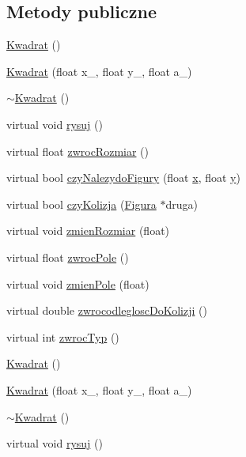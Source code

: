 \subsection*{Metody publiczne}
\begin{DoxyCompactItemize}
\item 
\hyperlink{classKwadrat_a7c105c83f59b0fa65af35714f4f55189}{Kwadrat} ()
\item 
\hyperlink{classKwadrat_a4cd1adc4069cc35048fdbf2eeaa8fdfd}{Kwadrat} (float x\-\_\-, float y\-\_\-, float a\-\_\-)
\item 
\hyperlink{classKwadrat_a0840295ae2e7d75daba30640fa1c1b56}{$\sim$\-Kwadrat} ()
\item 
virtual void \hyperlink{classKwadrat_a1e9cfa05c327d73f48c4ddd2f7b363db}{rysuj} ()
\item 
virtual float \hyperlink{classKwadrat_abbbda79a7812a6c8e9dcadfaa248982c}{zwroc\-Rozmiar} ()
\item 
virtual bool \hyperlink{classKwadrat_aaa67e4e84772b2670215a725d5711784}{czy\-Nalezydo\-Figury} (float \hyperlink{classFigura_ad640a05ebb1ddbf595124f0b31793e8a}{x}, float \hyperlink{classFigura_ab17e5953f2898eb729b2dc506640bce2}{y})
\item 
virtual bool \hyperlink{classKwadrat_ad0edd62e4fa3a541f6d39f902dd097cd}{czy\-Kolizja} (\hyperlink{classFigura}{Figura} $\ast$druga)
\item 
virtual void \hyperlink{classKwadrat_ad081e004bc8ba64d18989934ac95e272}{zmien\-Rozmiar} (float)
\item 
virtual float \hyperlink{classKwadrat_a1ad16348ebef01a8040e71025356e554}{zwroc\-Pole} ()
\item 
virtual void \hyperlink{classKwadrat_aa88d774d1a32bd8ceba12e9f2c003f8a}{zmien\-Pole} (float)
\item 
virtual double \hyperlink{classKwadrat_ab077c930d3ad276dc981615aed700b98}{zwrocodleglosc\-Do\-Kolizji} ()
\item 
virtual int \hyperlink{classKwadrat_a4fe24ee70d53bade8c1d5c29a4d9e028}{zwroc\-Typ} ()
\item 
\hyperlink{classKwadrat_a7c105c83f59b0fa65af35714f4f55189}{Kwadrat} ()
\item 
\hyperlink{classKwadrat_a4cd1adc4069cc35048fdbf2eeaa8fdfd}{Kwadrat} (float x\-\_\-, float y\-\_\-, float a\-\_\-)
\item 
\hyperlink{classKwadrat_a0840295ae2e7d75daba30640fa1c1b56}{$\sim$\-Kwadrat} ()
\item 
virtual void \hyperlink{classKwadrat_a2aa3729d2a139f6c8bf61c734a53f920}{rysuj} ()

\end{DoxyCompactItemize}

